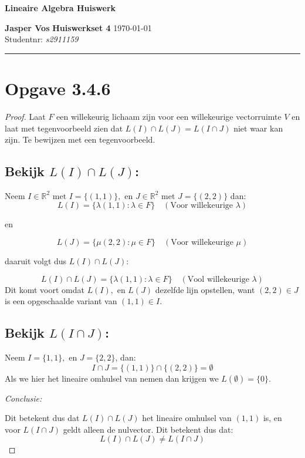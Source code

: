 \documentclass{article}
\newcommand{\R}{\mathbb{R}}
\newcommand{\en}{\text{ en }}
\newcommand{\met}{\text{ met }}
\begin{document}
{\Large \textbf{Lineaire Algebra Huiswerk}}

\bigskip

\textbf{Jasper Vos} \hfill \textbf{Huiswerkset 4} \hfill \today \\
Studentnr: \emph{s2911159}

\rule{\textwidth}{2pt}

\bigskip

\section*{Opgave 3.4.6}
\begin{proof}
    Laat $F$ een willekeurig lichaam zijn voor een willekeurige
    vectorruimte $V$ en laat met
    tegenvoorbeeld zien dat
    $L(I) \cap L(J) = L(I \cap J)$ niet waar kan zijn.
    Te bewijzen met een tegenvoorbeeld.

    \subsection*{Bekijk $L(I) \cap L(J)$:}
    Neem $I \in \R^2 \met I = \{(1,1)\}, \en J \in \R^2 \met J = \{(2,2)\}$ dan:
    \[L(I) =
        \{\lambda(1, 1) : \lambda \in F\} \quad (\text{Voor willekeurige $\lambda$})\]
    \begin{center}
        en
    \end{center}
    \[L(J) =
        \{\mu (2,2) : \mu \in F\} \quad (\text{Voor willekeurige $\mu$})\]
    \begin{center}
        daaruit volgt dus $L(I) \cap L(J)$:
    \end{center}
    \[ L(I) \cap L(J) = \{\lambda(1, 1) : \lambda \in F\} \quad (\text{Vool willekeurige $\lambda$})\]
    Dit komt voort omdat $L(I), \en L(J)$ dezelfde lijn opstellen,
    want $(2, 2)\in J$ is een opgeschaalde variant van $(1,1) \in I$.

    \subsection*{Bekijk $L(I \cap J)$:}
    Neem $I = \{1,1\}, \en J = \{2,2\}$, dan:
    \[ I \cap J = \{(1, 1)\} \cap \{(2, 2)\} = \emptyset\]
    Als we hier het lineaire omhulsel van nemen dan
    krijgen we $L(\emptyset) = \{0\}$.

    \bigskip

    \emph{Conclusie:}

    Dit betekent dus dat $L(I) \cap L(J)$ het lineaire omhulsel van $(1,1)$ is,
    en voor $L(I \cap J)$ geldt alleen de nulvector. Dit betekent dus dat:
    \[L(I) \cap L(J) \neq L(I \cap J)\]

\end{proof}
\newpage
\end{document}
